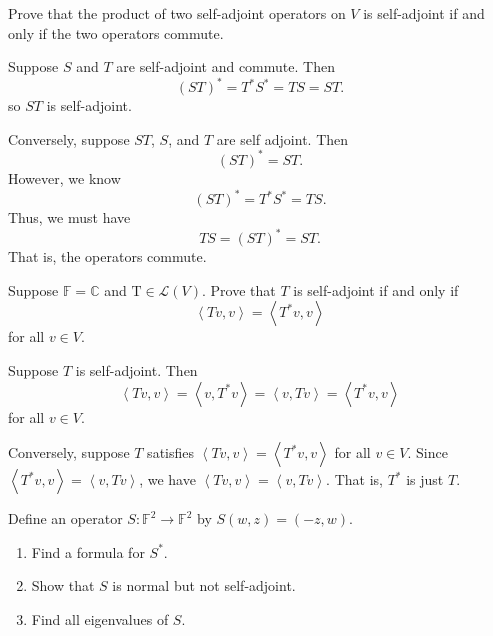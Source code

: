 \documentclass[12 pt, letterpaper]{hmcpset}
\begin{document}
\pagebreak

\begin{problem}[9]
	Prove that the product of two self-adjoint operators on $V$ is self-adjoint if and only if the two operators commute.
\end{problem}

\begin{solution}
	Suppose $S$ and $T$ are self-adjoint and commute. Then
	\[
		(ST)^{*} = T^{*} S^{*} = TS = ST.
	\]
	so $ST$ is self-adjoint.

	Conversely, suppose $ST$, $S$, and $T$ are self adjoint. Then
	\[
		(ST)^{*} = ST.
	\]
	However, we know
	\[
		(ST)^{*} = T^{*} S^{*} = TS.
	\]
	Thus, we must have
	\[
		TS = (ST)^{*} = ST.
	\]
	That is, the operators commute.
\end{solution}

\pagebreak

\begin{problem}[10]
	Suppose $\mathbb{F} = \mathbb{C}$ and $\mathrm{T} \in \mathcal{L}(V)$. Prove that $T$ is self-adjoint if and only if
	 \[
		\left < Tv, v \right > = \left < T^{*}v, v \right >
	\]
	for all $v \in V$.
\end{problem}

\begin{solution}
	Suppose $T$ is self-adjoint. Then
	\[
		\left < Tv, v \right > = \left < v, T^{*} v \right > = \left < v, Tv \right > = \left < T^{*} v, v \right >
	\]
	for all $v \in V$.

	Conversely, suppose $T$ satisfies $\left < Tv, v \right > = \left < T^{*} v, v \right >$ for all $v \in V$. Since $\left < T^{*} v, v \right > = \left < v, T v \right >$, we have $\left < Tv, v \right > = \left < v, Tv \right >$. That is, $T^{*}$ is just $T$.
\end{solution}

\pagebreak

\begin{problem}[11]
	Define an operator $S: \mathbb{F}^{2} \to \mathbb{F}^{2}$ by $S(w, z) = (-z, w)$.
	\begin{enumerate}
		\item Find a formula for $S^{*}$.
		\item Show that $S$ is normal but not self-adjoint.
		\item Find all eigenvalues of $S$.
	\end{enumerate}
\end{problem}
\end{document}
